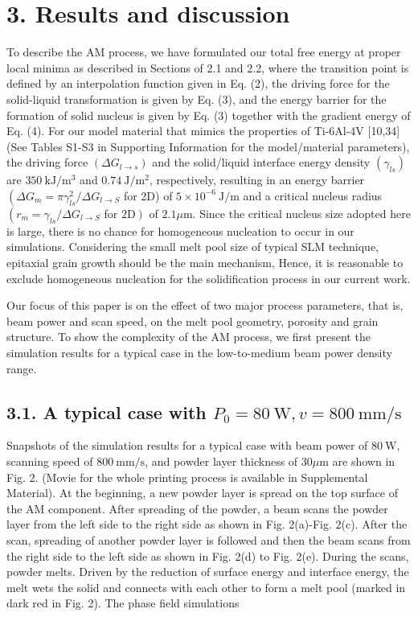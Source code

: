 \documentclass[10pt]{article}
\begin{document}
\section*{3. Results and discussion}
To describe the AM process, we have formulated our total free energy at proper local minima as described in Sections of 2.1 and 2.2, where the transition point is defined by an interpolation function given in Eq. (2), the driving force for the solid-liquid transformation is given by Eq. (3), and the energy barrier for the formation of solid nucleus is given by Eq. (3) together with the gradient energy of Eq. (4). For our model material that mimics the properties of Ti-6Al-4V [10,34] (See Tables S1-S3 in Supporting Information for the model/material parameters), the driving force $\left(\Delta G_{l \rightarrow s}\right)$ and the solid/liquid interface energy density $\left(\gamma_{l s}\right)$ are $350 \mathrm{~kJ} / \mathrm{m}^{3}$ and $0.74 \mathrm{~J} / \mathrm{m}^{2}$, respectively, resulting in an energy barrier $\left(\Delta G_{m}=\pi \gamma_{l s}^{2} / \Delta G_{l \rightarrow S}\right.$ for 2D) of $5 \times 10^{-6} \mathrm{~J} / \mathrm{m}$ and a critical nucleus radius $\left(r_{m}=\gamma_{l s} / \Delta G_{l \rightarrow S}\right.$ for $\left.2 \mathrm{D}\right)$ of $2.1 \mu \mathrm{m}$. Since the critical nucleus size adopted here is large, there is no chance for homogeneous nucleation to occur in our simulations. Considering the small melt pool size of typical SLM technique, epitaxial grain growth should be the main mechanism, Hence, it is reasonable to exclude homogeneous nucleation for the solidification process in our current work.

Our focus of this paper is on the effect of two major process parameters, that is, beam power and scan speed, on the melt pool geometry, porosity and grain structure. To show the complexity of the AM process, we first present the simulation results for a typical case in the low-to-medium beam power density range.

\subsection*{3.1. A typical case with $P_{0}=80 \mathrm{~W}, v=800 \mathrm{~mm} / \mathrm{s}$}
Snapshots of the simulation results for a typical case with beam power of $80 \mathrm{~W}$, scanning speed of $800 \mathrm{~mm} / \mathrm{s}$, and powder layer thickness of $30 \mu \mathrm{m}$ are shown in Fig. 2. (Movie for the whole printing process is available in Supplemental Material). At the beginning, a new powder layer is spread on the top surface of the AM component. After spreading of the powder, a beam scans the powder layer from the left side to the right side as shown in Fig. 2(a)-Fig. 2(c). After the scan, spreading of another powder layer is followed and then the beam scans from the right side to the left side as shown in Fig. 2(d) to Fig. 2(e). During the scans, powder melts. Driven by the reduction of surface energy and interface energy, the melt wets the solid and connects with each other to form a melt pool (marked in dark red in Fig. 2). The phase field simulations
\end{document}
